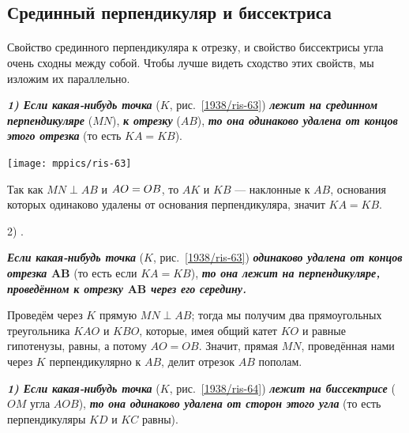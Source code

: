 \subsection*{Срединный перпендикуляр и биссектриса} 

\paragraph{}\label{1938/58}
Свойство срединного перпендикуляра к отрезку, и свойство биссектрисы угла очень сходны между собой.
Чтобы лучше видеть сходство этих свойств, мы изложим их параллельно.


\setlength{\columnseprule}{.2pt}
\begin{paracol}{2}


{\sloppy

\textbf{\emph{1) Если какая-нибудь точка}} ($K$, рис.~\ref{1938/ris-63}) \textbf{\emph{лежит на срединном перпендикуляре}} ($MN$), \textbf{\emph{к отрезку}} ($AB$), \textbf{\emph{то она одинаково удалена от концов этого отрезка}} (то есть $KA=KB$).

\medskip

{\centering
\texttt{[image: mppics/ris-63]}
\label{1938/ris-63}
\addtocounter{figure}{1}
}

\medskip

Так как \mbox{$MN\perp AB$} и $AO\z=OB$, то $AK$ и $KB$ — наклонные к $AB$, основания которых одинаково удалены от основания перпендикуляра, значит $KA=KB$.

2) .

\textbf{\emph{Если какая-нибудь точка}} ($K$, рис.~\ref{1938/ris-63}) \textbf{\emph{одинаково удалена от концов отрезка $\bm{AB}$}} (то есть если $KA=KB$), \textbf{\emph{то она лежит на перпендикуляре, проведённом к отрезку $\bm{AB}$ через его середину.}}

Проведём через $K$ прямую $MN\perp AB$;
тогда мы получим два прямоугольных треугольника $KAO$ и $KBO$, которые, имея общий катет $KO$ и равные гипотенузы, равны, а потому $AO=OB$.
Значит, прямая $MN$, проведённая нами через $K$ перпендикулярно к $AB$, делит отрезок $AB$ пополам.

}

\switchcolumn


{\sloppy

\textbf{\emph{1) Если какая-нибудь точка}} ($K$, рис.~\ref{1938/ris-64}) \textbf{\emph{лежит на биссектрисе}} ($OM$ угла $AOB$), \textbf{\emph{то она одинаково удалена от сторон этого угла}} (то есть перпендикуляры $KD$ и $KC$ равны).

}
\end{paracol}

